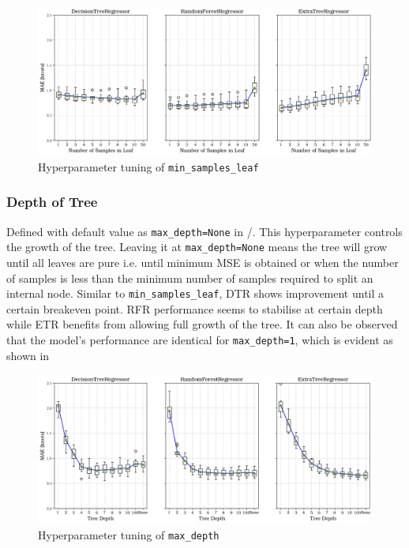 \begin{figure}[h]
    \centering
        \includegraphics[width=.9\textwidth]{02_figures/hpo_min_samples_leaf_mae.png}
        \caption{Hyperparameter tuning of {\tt min\_samples\_leaf}}
        \label{fig:hpo_min_samples_leaf}
\end{figure}

\subsubsection*{Depth of Tree}\label{sec:max_depth}

Defined with default value as {\tt max\_depth=None} in \scikit/. This hyperparameter controls the growth of the tree. Leaving it at {\tt max\_depth=None} means the tree will grow until all leaves are pure i.e. until minimum MSE is obtained or when the number of samples is less than the minimum number of samples required to split an internal node. Similar to {\tt min\_samples\_leaf}, DTR shows improvement until a certain breakeven point. RFR performance seems to stabilise at certain depth while ETR benefits from allowing full growth of the tree. It can also be observed that the model's performance are identical for {\tt max\_depth=1}, which is evident as shown in   

\begin{figure}[h]
    \centering
        \includegraphics[width=.9\textwidth]{02_figures/hpo_max_depth_mae.png}
        \caption{Hyperparameter tuning of {\tt max\_depth}}
        \label{fig:hpo_max_depth}
\end{figure}

